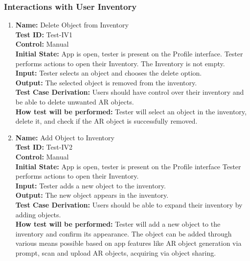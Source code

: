 \documentclass[12pt, titlepage]{article}
\begin{document}
\subsubsection{Interactions with User Inventory}

\begin{enumerate}

  \item \textbf{Name:} Delete Object from Inventory \label{itm:Test-IV1} \\
  \textbf{Test ID:} Test-IV1 \\
  \textbf{Control:} Manual \\
  \textbf{Initial State:} App is open, tester is present on the Profile interface. Tester performs actions to open their Inventory. The Inventory is not empty. \\
  \textbf{Input:} Tester selects an object and chooses the delete option. \\
  \textbf{Output:} The selected object is removed from the inventory. \\
  \textbf{Test Case Derivation:} Users should have control over their inventory and be able to delete unwanted AR objects. \\
  \textbf{How test will be performed:} Tester will select an object in the inventory, delete it, and check if the AR object is successfully removed. \\

  \item \textbf{Name:} Add Object to Inventory \label{itm:Test-IV2} \\
  \textbf{Test ID:} Test-IV2 \\
  \textbf{Control:} Manual \\
  \textbf{Initial State:} App is open, tester is present on the Profile interface Tester performs actions to open their Inventory. \\
  \textbf{Input:} Tester adds a new object to the inventory. \\
  \textbf{Output:} The new object appears in the inventory. \\
  \textbf{Test Case Derivation:} Users should be able to expand their inventory by adding objects. \\
  \textbf{How test will be performed:} Tester will add a new object to the inventory and confirm its appearance. The object can be added through various means possible based on app features like AR object generation via prompt, scan and upload AR objects, acquiring via object sharing. \\


\end{enumerate}
\end{document}
